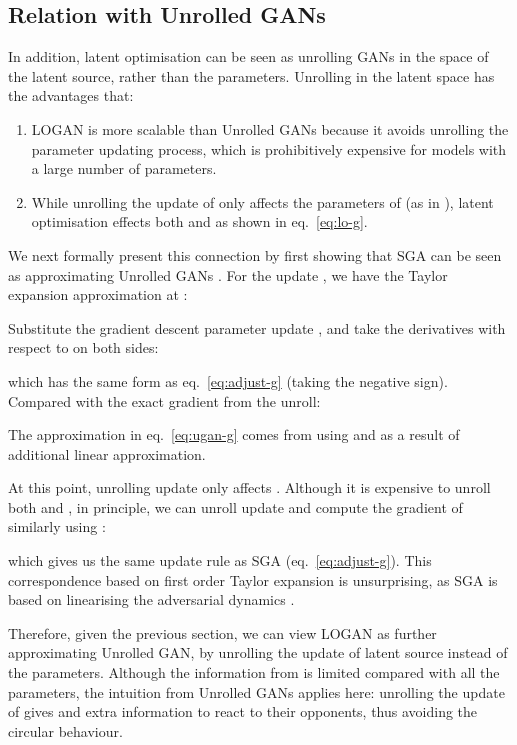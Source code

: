 \documentclass{article} \usepackage{iclr2020_conference,times}
\begin{document}
\subsection{Relation with Unrolled GANs}
\label{app:unroll}

In addition, latent optimisation can be seen as unrolling GANs \citep{DBLP:journals/corr/MetzPPS16} in the space of the latent source, rather than the parameters. Unrolling in the latent space has the advantages that:
\begin{enumerate}
    \item LOGAN is more scalable than Unrolled GANs because it avoids unrolling the parameter updating process, which is prohibitively expensive for models with a large number of parameters.
    \item While unrolling the update of  only affects the parameters of  (as in \citealt{DBLP:journals/corr/MetzPPS16}), latent optimisation effects  both  and  as shown in eq.~\ref{eq:lo-g}.
\end{enumerate}
We next formally present this connection by first showing that SGA can be seen as approximating Unrolled GANs \citep{DBLP:journals/corr/MetzPPS16}. For the update , we have the Taylor expansion approximation at :

Substitute the gradient descent parameter update , and take the derivatives with respect to  on both sides:

which has the same form as eq.~\ref{eq:adjust-g} (taking the negative sign).
Compared with the exact gradient from the unroll:

The approximation in eq.~\ref{eq:ugan-g} comes from using  and  as a result of additional linear approximation.

At this point, unrolling  update only affects
. Although it is expensive to unroll both  and , in principle, we can unroll  update and compute the gradient of  similarly using :

which gives us the same update rule as SGA (eq.~\ref{eq:adjust-g}). This correspondence based on first order Taylor expansion is unsurprising, as SGA is based on linearising the adversarial dynamics \citep{balduzzi2018mechanics}.

Therefore, given the previous section, we can view LOGAN as further approximating Unrolled GAN, by unrolling the update of latent source  instead of the parameters. Although the information from  is limited compared with all the parameters, the intuition from Unrolled GANs applies here: unrolling the update of  gives  and  extra information to react to their opponents, thus avoiding the circular behaviour.
\end{document}
